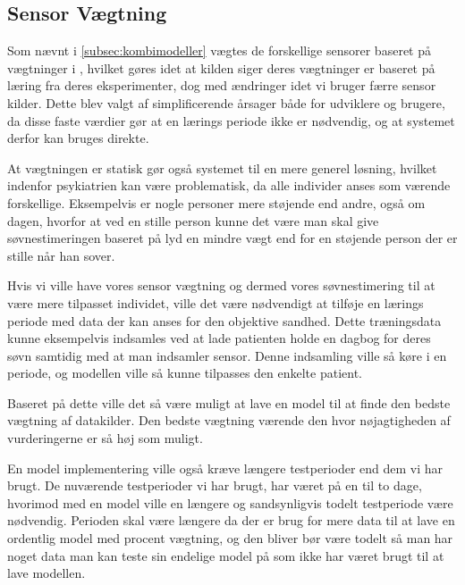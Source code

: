 \subsection{Sensor Vægtning}
Som nævnt i \cref{subsec:kombimodeller} vægtes de forskellige sensorer baseret på vægtninger i \citet{6563918}, hvilket gøres idet at kilden siger deres vægtninger er baseret på læring fra deres eksperimenter, dog med ændringer idet vi bruger færre sensor kilder.
Dette blev valgt af simplificerende årsager både for udviklere og brugere, da disse faste værdier gør at en lærings periode ikke er nødvendig, og at systemet derfor kan bruges direkte.

At vægtningen er statisk gør også systemet til en mere generel løsning, hvilket indenfor psykiatrien kan være problematisk, da alle individer anses som værende forskellige. 
Eksempelvis er nogle personer mere støjende end andre, også om dagen, hvorfor at ved en stille person kunne det være man skal give søvnestimeringen baseret på lyd en mindre vægt end for en støjende person der er stille når han sover.

Hvis vi ville have vores sensor vægtning og dermed vores søvnestimering til at være mere tilpasset individet, ville det være nødvendigt at tilføje en lærings periode med data der kan anses for den objektive sandhed.
Dette træningsdata kunne eksempelvis indsamles ved at lade patienten holde en dagbog for deres søvn samtidig med at man indsamler sensor.
Denne indsamling ville så køre i en periode, og modellen ville så kunne tilpasses den enkelte patient.

Baseret på dette ville det så være muligt at lave en model til at finde den bedste vægtning af datakilder.
Den bedste vægtning værende den hvor nøjagtigheden af vurderingerne er så høj som muligt.

En model implementering ville også kræve længere testperioder end dem vi har brugt.
De nuværende testperioder vi har brugt, har været på en til to dage, hvorimod med en model ville en længere og sandsynligvis todelt testperiode være nødvendig.
Perioden skal være længere da der er brug for mere data til at lave en ordentlig model med procent vægtning, og den bliver bør være todelt så man har noget data man kan teste sin endelige model på som ikke har været brugt til at lave modellen.
